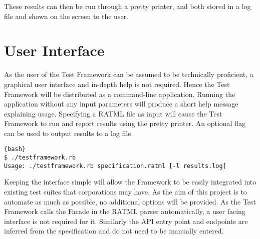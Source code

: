 These results can then be run through a pretty printer, and both stored in a log file and shown on the screen to the user.

\section{User Interface}

As the user of the Test Framework can be assumed to be technically proficient, a graphical user interface and in-depth help is not required. Hence the Test Framework will be distributed as a command-line application. Running the application without any input parameters will produce a short help message explaining usage. Specifying a RATML file as input will cause the Test Framework to run and report results using the pretty printer. An optional flag can be used to output results to a log file.

\begin{lstlisting}{bash}
$ ./testframework.rb
Usage: ./testframework.rb specification.ratml [-l results.log]
\end{lstlisting}

Keeping the interface simple will allow the Framework to be easily integrated into existing test suites that corporations may have. As the aim of this project is to automate as much as possible, no additional options will be provided. As the Test Framework calls the Facade in the RATML parser automatically, a user facing interface is not required for it. Similarly the API entry point and endpoints are inferred from the specification and do not need to be manually entered.